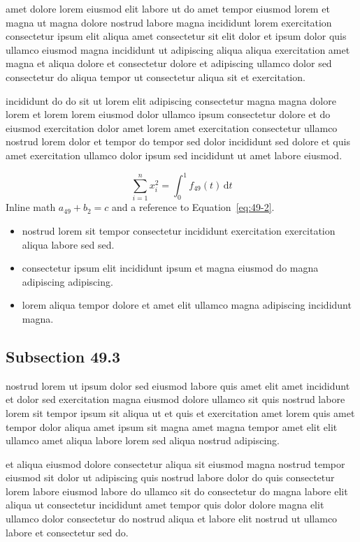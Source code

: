 \documentclass{article}
\begin{document}
amet dolore lorem eiusmod elit labore ut do amet tempor eiusmod lorem et magna ut magna dolore nostrud labore magna incididunt lorem exercitation consectetur ipsum elit aliqua amet consectetur sit elit dolor et ipsum dolor quis ullamco eiusmod magna incididunt ut adipiscing aliqua aliqua exercitation amet magna et aliqua dolore et consectetur dolore et adipiscing ullamco dolor sed consectetur do aliqua tempor ut consectetur aliqua sit et exercitation.

incididunt do do sit ut lorem elit adipiscing consectetur magna magna dolore lorem et lorem lorem eiusmod dolor ullamco ipsum consectetur dolore et do eiusmod exercitation dolor amet lorem amet exercitation consectetur ullamco nostrud lorem dolor et tempor do tempor sed dolor incididunt sed dolore et quis amet exercitation ullamco dolor ipsum sed incididunt ut amet labore eiusmod.

\begin{equation}\label{eq:49-2}
  \sum_{i=1}^{n} x_i^{2} = \int_0^1 f_{49}(t)\,\mathrm{d}t
\end{equation}
Inline math $a_{49} + b_{2} = c$ and a reference to Equation~\eqref{eq:49-2}.

\begin{itemize}
  \item nostrud lorem sit tempor consectetur incididunt exercitation exercitation aliqua labore sed sed.
  \item consectetur ipsum elit incididunt ipsum et magna eiusmod do magna adipiscing adipiscing.
  \item lorem aliqua tempor dolore et amet elit ullamco magna adipiscing incididunt magna.
\end{itemize}

\subsection{Subsection 49.3}\label{sec:49-3}
nostrud lorem ut ipsum dolor sed eiusmod labore quis amet elit amet incididunt et dolor sed exercitation magna eiusmod dolore ullamco sit quis nostrud labore lorem sit tempor ipsum sit aliqua ut et quis et exercitation amet lorem quis amet tempor dolor aliqua amet ipsum sit magna amet magna tempor amet elit elit ullamco amet aliqua labore lorem sed aliqua nostrud adipiscing.

et aliqua eiusmod dolore consectetur aliqua sit eiusmod magna nostrud tempor eiusmod sit dolor ut adipiscing quis nostrud labore dolor do quis consectetur lorem labore eiusmod labore do ullamco sit do consectetur do magna labore elit aliqua ut consectetur incididunt amet tempor quis dolor dolore magna elit ullamco dolor consectetur do nostrud aliqua et labore elit nostrud ut ullamco labore et consectetur sed do.
\end{document}
